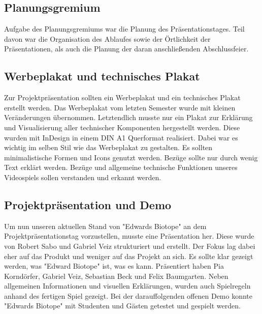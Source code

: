 \subsection{Planungsgremium}
Aufgabe des Planungsgremiums war die Planung des Präsentationstages. 
Teil davon war die Organisation des Ablaufes sowie der Örtlichkeit der Präsentationen, als auch die Planung der daran anschließenden Abschlussfeier. 

\subsection{Werbeplakat und technisches Plakat}
Zur Projektpräsentation sollten ein Werbeplakat und ein technisches Plakat erstellt werden. Das Werbeplakat vom letzten Semester wurde mit kleinen Veränderungen übernommen. Letztendlich musste nur ein Plakat zur Erklärung und Visualisierung aller technischer Komponenten hergestellt werden. Diese wurden mit InDesign in einem DIN A1 Querformat realisiert. Dabei war es wichtig im selben Stil wie das Werbeplakat zu gestalten. Es sollten minimalistische Formen und Icons genutzt werden. Bezüge sollte nur durch wenig Text erklärt werden. Bezüge und allgemeine technische Funktionen unseres Videospiels sollen verstanden und erkannt werden.

\subsection{Projektpräsentation und Demo}
Um nun unseren aktuellen Stand von "Edwards Biotope" an dem Projektpräsentationstag vorzustellen, musste eine Präsentation her. Diese wurde von Robert Sabo und Gabriel Veiz strukturiert und erstellt. Der Fokus lag dabei eher auf das Produkt und weniger auf das Projekt an sich. Es sollte klar gezeigt werden, was "Edward Biotope" ist, was es kann. Präsentiert haben Pia Korndörfer, Gabriel Veiz, Sebastian Beck und Felix Baumgarten. Neben allgemeinen Informationen und visuellen Erklärungen, wurden auch Spielregeln anhand des fertigen Spiel gezeigt. Bei der darauffolgenden offenen Demo konnte "Edwards Biotope" mit Studenten und Gästen getestet und gespielt werden.
